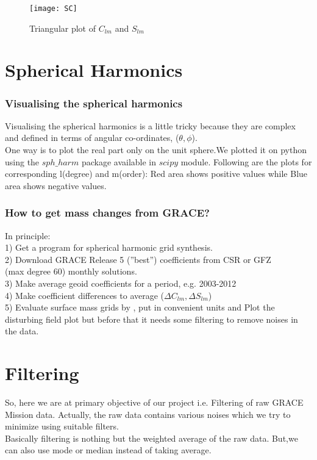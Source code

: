 \documentclass[a4paper,12pt]{report}
\begin{document}

\begin{figure}[!h]
	\centering
    \texttt{[image: SC]}
    \caption{Triangular plot of $C_{lm}$ and  $S_{lm}$}
    \newpage
\end{figure}

\newpage
\chapter{Spherical Harmonics}
\subsection{Visualising the spherical harmonics}
Visualising the spherical harmonics is a little tricky because they are complex and defined in terms of angular co-ordinates, ($\theta,\phi$).\\
One way is to plot the real part only on the unit sphere.We plotted it on
python using the $sph\_harm$ package available in $scipy$ module.
Following are the plots for corresponding l(degree) and m(order):
Red area shows positive values while Blue area shows negative values.

\subsection{How  to get mass changes from GRACE?}
In principle:\\
1) Get a program for spherical harmonic grid synthesis.\\
2) Download GRACE Release 5 (”best”) coefficients from CSR or GFZ \\(max degree 60) monthly solutions.\\
3) Make average geoid coefficients for a period, e.g. 2003-2012\\
4) Make coefficient differences to average ($\Delta C_{lm}, \Delta S_{lm}$)\\
5) Evaluate surface mass grids by , put in convenient units and Plot the disturbing field plot but before that it needs some filtering to remove noises in the data. \\


\chapter{Filtering}
So, here we are at primary objective of our project i.e. Filtering of raw GRACE Mission data. Actually, the raw data contains various noises which we try to minimize using suitable filters.
\\
Basically filtering is nothing but the weighted average of the raw data. But,we can also use mode or median instead of taking average. 
\end{document}
